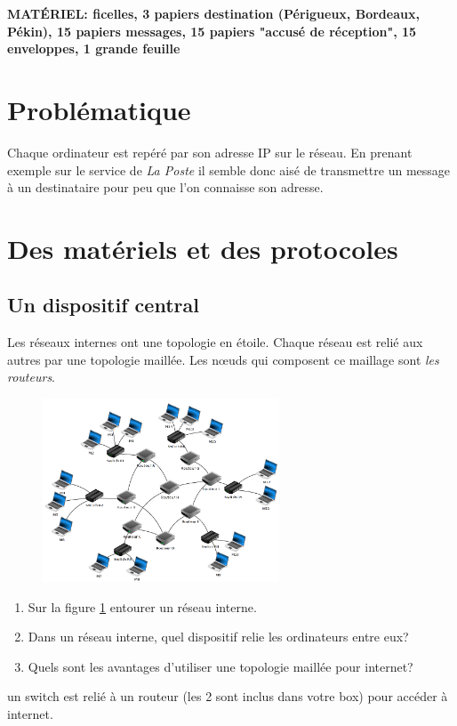 \documentclass[a4paper,11pt]{article}
\begin{document}
\begin{Form}
\begin{commentprof}
\textbf{MATÉRIEL: ficelles, 3 papiers destination (Périgueux, Bordeaux, Pékin), 15 papiers messages, 15 papiers "accusé de réception", 15 enveloppes, 1 grande feuille}
\end{commentprof}
\section{Problématique}
Chaque ordinateur est repéré par son adresse IP sur le réseau. En prenant exemple sur le service de \emph{La Poste} il semble donc aisé de transmettre un message à un destinataire pour peu que l'on connaisse son adresse.
\begin{center}
\end{center}
\section{Des matériels et des protocoles}
\subsection{Un dispositif central}
Les réseaux internes ont une topologie en étoile. Chaque réseau est relié aux autres par une topologie maillée. Les nœuds qui composent ce maillage sont \emph{les routeurs}.
\begin{figure}[!h]
\centering
\includegraphics[width=7cm]{ressources/routage.png}
\label{routage}
\end{figure}
\begin{activite}
\begin{enumerate}
\item Sur la figure \ref{routage} entourer un réseau interne.
\item Dans un réseau interne, quel dispositif relie les ordinateurs entre eux?
\item Quels sont les avantages d'utiliser une topologie maillée pour internet?
\end{enumerate}
\end{activite}
\begin{commentprof}
un switch est relié à un routeur (les 2 sont inclus dans votre box) pour accéder à internet.
\end{commentprof}

\end{Form}
\end{document}
